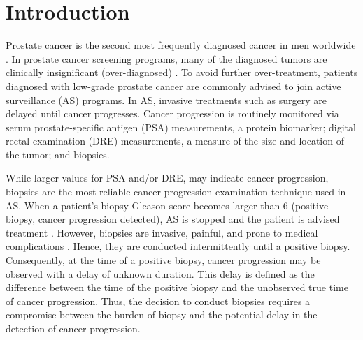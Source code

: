 \documentclass[a4paper, 12pt]{article}
\begin{document}
\section{Introduction}
\label{sec:introduction}
Prostate cancer is the second most frequently diagnosed cancer in men worldwide \citep{GlobalCancerStats2012}. In prostate cancer screening programs, many of the diagnosed tumors are clinically insignificant (over-diagnosed) \citep{etzioni2002overdiagnosis}. To avoid further over-treatment, patients diagnosed with low-grade prostate cancer are commonly advised to join active surveillance (AS) programs. In AS, invasive treatments such as surgery are delayed until cancer progresses. Cancer progression is routinely monitored via serum prostate-specific antigen (PSA) measurements, a protein biomarker; digital rectal examination (DRE) measurements, a measure of the size and location of the tumor; and biopsies.

While larger values for PSA and/or DRE, may indicate cancer progression, biopsies are the most reliable cancer progression examination technique used in AS. When a patient's biopsy Gleason score becomes larger than 6 (positive biopsy, cancer progression detected), AS is stopped and the patient is advised treatment \citep{bokhorst2015compliance}. However, biopsies are invasive, painful, and prone to medical complications \citep{ehdaie2014impact,fujita2009serial}. Hence, they are conducted intermittently until a positive biopsy. Consequently, at the time of a positive biopsy, cancer progression may be observed with a delay of unknown duration. This delay is defined as the difference between the time of the positive biopsy and the unobserved true time of cancer progression. Thus, the decision to conduct biopsies requires a compromise between the burden of biopsy and the potential delay in the detection of cancer progression.
\end{document}
